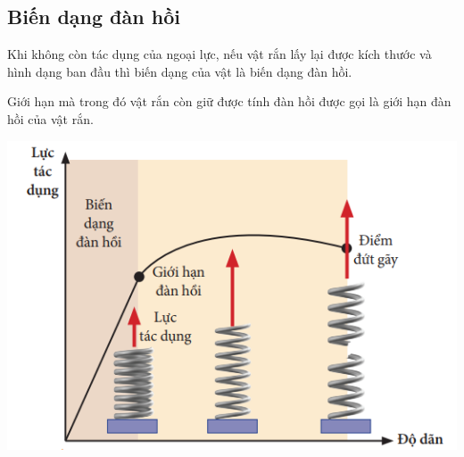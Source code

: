 \subsection{Biến dạng đàn hồi}
Khi không còn tác dụng của ngoại lực, nếu vật rắn lấy lại được kích thước và hình dạng ban đầu thì biến dạng của vật là biến dạng đàn hồi.

Giới hạn mà trong đó vật rắn còn giữ được tính đàn hồi được gọi là giới hạn đàn hồi của vật rắn.
\begin{center}
	\includegraphics[width=0.45\linewidth]{../figs/VN10-2023-PH-TP033-1}
\end{center}

